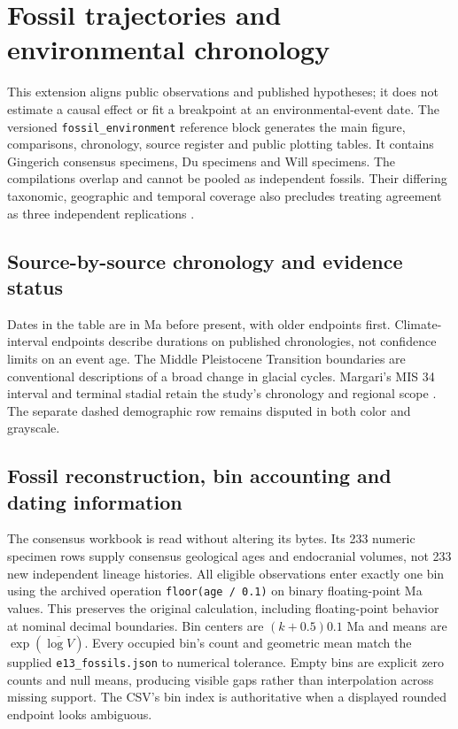 \section{Fossil trajectories and environmental chronology}\label{sec:minds-environment-audit}

This extension aligns public observations and published hypotheses; it does not estimate a causal effect or fit a breakpoint at an environmental-event date. The versioned \texttt{fossil\_environment} reference block generates the main figure, comparisons, chronology, source register and public plotting tables. It contains \MwcFossilN{} Gingerich consensus specimens, \MwcDuN{} Du specimens and \MwcWillN{} Will specimens. The compilations overlap and cannot be pooled as independent fossils. Their differing taxonomic, geographic and temporal coverage also precludes treating agreement as three independent replications \citep{gingerich2022,du2018,will2021}.

\subsection{Source-by-source chronology and evidence status}

Dates in the table are in Ma before present, with older endpoints first. Climate-interval endpoints describe durations on published chronologies, not confidence limits on an event age. The Middle Pleistocene Transition boundaries are conventional descriptions of a broad change in glacial cycles. Margari's MIS 34 interval and terminal stadial retain the study's chronology and regional scope \citep{clark2006,margari2023}. The separate dashed demographic row remains disputed in both color and grayscale.



\subsection{Fossil reconstruction, bin accounting and dating information}

The consensus workbook is read without altering its bytes. Its 233 numeric specimen rows supply consensus geological ages and endocranial volumes, not 233 new independent lineage histories. All eligible observations enter exactly one bin using the archived operation \texttt{floor(age / 0.1)} on binary floating-point Ma values. This preserves the original calculation, including floating-point behavior at nominal decimal boundaries. Bin centers are $(k+0.5)0.1$ Ma and means are $\exp(\overline{\log V})$. Every occupied bin's count and geometric mean match the supplied \texttt{e13\_fossils.json} to numerical tolerance. Empty bins are explicit zero counts and null means, producing visible gaps rather than interpolation across missing support. The CSV's bin index is authoritative when a displayed rounded endpoint looks ambiguous.

